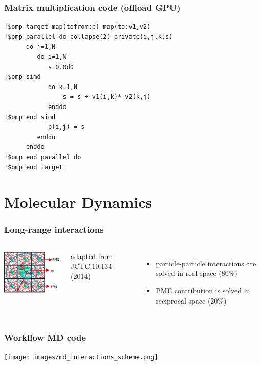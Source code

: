\begin{frame}[fragile]
	\frametitle{Matrix multiplication code (offload GPU)}
{\small 
        \begin{verbatim}             
!$omp target map(tofrom:p) map(to:v1,v2)
!$omp parallel do collapse(2) private(i,j,k,s)
      do j=1,N
         do i=1,N
            s=0.0d0
!$omp simd 
            do k=1,N
                s = s + v1(i,k)* v2(k,j)
            enddo
!$omp end simd
            p(i,j) = s
         enddo
      enddo
!$omp end parallel do
!$omp end target
        \end{verbatim}
}
\end{frame}





\section{Molecular Dynamics}
\begin{frame}
	\frametitle{Long-range interactions}
\begin{columns}
	\column[T]{5cm}
\includegraphics[width=5cm]{images/pppme.png}

{\tiny adapted from JCTC,10,134 (2014)}
	\column[T]{5cm}
	\begin{itemize}
		\item	particle-particle interactions are solved in real space (80$\%$)
		\item	PME contribution is solved in reciprocal space (20$\%$)
	\end{itemize}
\end{columns}
\end{frame}
%
\begin{frame}
	\frametitle{Workflow MD code}
        \begin{center}
\texttt{[image: images/md\_interactions\_scheme.png]}
        \end{center}

\end{frame}
%
